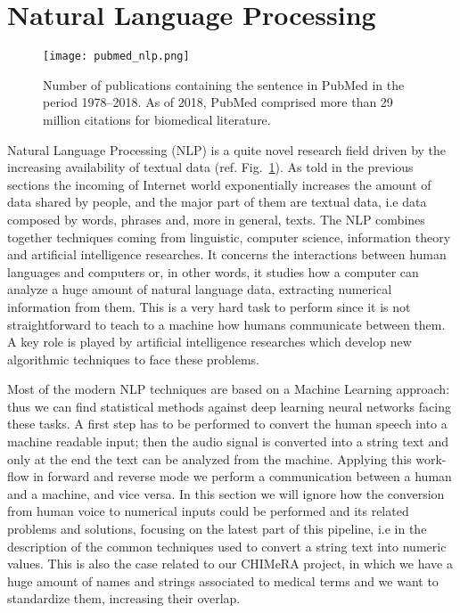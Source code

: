 \documentclass{standalone}
\begin{document}
\section[NLP]{Natural Language Processing}\label{chimera:nlp}


\begin{center}
\begin{figure}[htbp]
\centering
\texttt{[image: pubmed\_nlp.png]}
\caption{Number of publications containing the sentence  in PubMed in the period 1978–2018.
As of 2018, PubMed comprised more than 29 million citations for biomedical literature.
}
\label{fig:pubmed_nlp}
\end{figure}
\end{center}


Natural Language Processing (NLP) is a quite novel research field driven by the increasing availability of textual data (ref. Fig.~\ref{fig:pubmed_nlp}).
As told in the previous sections the incoming of Internet world exponentially increases the amount of data shared by people, and the major part of them are textual data, i.e data composed by words, phrases and, more in general, texts.
The NLP combines together techniques coming from linguistic, computer science, information theory and artificial intelligence researches.
It concerns the interactions between human languages and computers or, in other words, it studies how a computer can analyze a huge amount of natural language data, extracting numerical information from them.
This is a very hard task to perform since it is not straightforward to teach to a machine how humans communicate between them.
A key role is played by artificial intelligence researches which develop new algorithmic techniques to face these problems.

Most of the modern NLP techniques are based on a Machine Learning approach: thus we can find statistical methods against deep learning neural networks facing these tasks.
A first step has to be performed to convert the human speech into a machine readable input; then the audio signal is converted into a string text and only at the end the text can be analyzed from the machine.
Applying this work-flow in forward and reverse mode we perform a communication between a human and a machine, and vice versa.
In this section we will ignore how the conversion from human voice to numerical inputs could be performed and its related problems and solutions, focusing on the latest part of this pipeline, i.e in the description of the common techniques used to convert a string text into numeric values.
This is also the case related to our \textsf{CHIMeRA} project, in which we have a huge amount of names and strings associated to medical terms and we want to standardize them, increasing their overlap.
\end{document}
